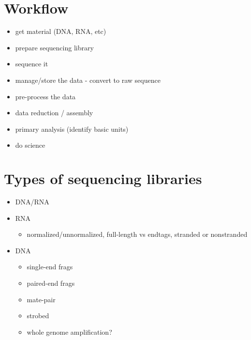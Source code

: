 \documentclass{article}
\begin{document}
    \section{Workflow}
        \begin{itemize}
            \item get material (DNA, RNA, etc)
            \item prepare sequencing library
            \item sequence it
            \item manage/store the data - convert to raw sequence
            \item pre-process the data
            \item data reduction / assembly
            \item primary analysis (identify basic units)
            \item do science
        \end{itemize}

    \section{Types of sequencing libraries}
        \begin{itemize}
            \item DNA/RNA
            \item RNA
            \begin{itemize}
                \item normalized/unnormalized, full-length vs endtags, stranded or nonstranded
            \end{itemize}
            \item DNA
            \begin{itemize}
                \item single-end frags
                \item paired-end frags
                \item mate-pair
                \item strobed
                \item whole genome amplification?
            \end{itemize}
        \end{itemize}
\end{document}
